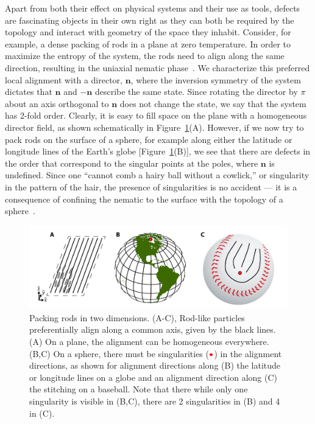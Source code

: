Apart from both their effect on physical systems and their use as tools, defects are fascinating objects in their own right as they can both be required by the topology and interact with geometry of the space they inhabit.
Consider, for example, a dense packing of rods in a plane at zero temperature.
In order to maximize the entropy of the system, the rods need to align along the same direction, resulting in the uniaxial nematic phase~\cite{RN204}.
We characterize this preferred local alignment with a director, $\mathbf{n}$, where the inversion symmetry of the system dictates that $\mathbf{n}$ and $\mathbf{-n}$ describe the same state.
Since rotating the director by $\pi$ about an axis orthogonal to $\mathbf{n}$ does not change the state, we say that the system has 2-fold order.
Clearly, it is easy to fill space on the plane with a homogeneous director field, as shown schematically in Figure~\ref{f:1-RodsPlane}(A).
However, if we now try to pack rods on the surface of a sphere, for example along either the latitude or longitude lines of the Earth's globe [Figure~\ref{f:1-RodsPlane}(B)], we see that there are defects in the order that correspond to the singular points at the poles, where $\mathbf{n}$ is undefined.
Since one ``cannot comb a hairy ball without a cowlick,'' or singularity in the pattern of the hair, the presence of singularities is no accident --- it is a consequence of confining the nematic to the surface with the topology of a sphere~\cite{RN209,RN169}.
\begin{figure}
  \centering
  \includegraphics{figures/C1/Ch1-Figs_RodsPlane.png}
  \caption{Packing rods in two dimensions.
  (A-C), Rod-like particles preferentially align along a common axis, given by the black lines.
  (A) On a plane, the alignment can be homogeneous everywhere.
  (B,C) On a sphere, there must be singularities (${\color{red} \bullet}$) in the alignment directions, as shown for alignment directions along (B) the latitude or longitude lines on a globe and an alignment direction along (C) the stitching on a baseball.
  Note that there while only one singularity is visible in (B,C), there are 2 singularities in (B) and 4 in (C).}\label{f:1-RodsPlane}
\end{figure}

